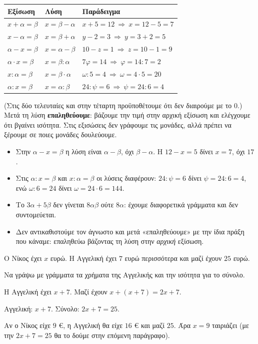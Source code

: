 \begin{center}
\renewcommand{\arraystretch}{1.5}
\begin{tabular}{@{}lll@{}}
\toprule
\textbf{Εξίσωση} & \textbf{Λύση} & \textbf{Παράδειγμα}\\
\midrule
$x+\alpha=\beta$ & $x=\beta-\alpha$ & $x+5=12\ \Rightarrow\ x=12-5=7$\\
$x-\alpha=\beta$ & $x=\beta+\alpha$ & $y-2=3\ \Rightarrow\ y=3+2=5$\\
$\alpha-x=\beta$ & $x=\alpha-\beta$ & $10-z=1\ \Rightarrow\ z=10-1=9$\\
$\alpha\cdot x=\beta$ & $x=\beta:\alpha$ & $7\varphi=14\ \Rightarrow\ \varphi=14:7=2$\\
$x:\alpha=\beta$ & $x=\beta\cdot\alpha$ & $\omega:5=4\ \Rightarrow\ \omega=4\cdot5=20$\\
$\alpha:x=\beta$ & $x=\alpha:\beta$ & $24:\psi=6\ \Rightarrow\ \psi=24:6=4$\\
\bottomrule
\end{tabular}
\end{center}

(Στις δύο τελευταίες και στην τέταρτη προϋποθέτουμε ότι δεν διαιρούμε με το $0$.) Μετά τη λύση \textbf{επαληθεύουμε}: βάζουμε την τιμή στην αρχική εξίσωση και ελέγχουμε ότι βγαίνει ισότητα. Στις εξισώσεις δεν γράφουμε τις μονάδες, αλλά πρέπει να ξέρουμε σε ποιες μονάδες δουλεύουμε.

\begin{prosoxi}
\begin{itemize}[leftmargin=1.2em,itemsep=0.3ex,topsep=2pt]
\item Στην $\alpha-x=\beta$ η λύση είναι $\alpha-\beta$, όχι $\beta-\alpha$. Η $12-x=5$ δίνει $x=7$, όχι $17$.
\item Στις $\alpha:x=\beta$ και $x:\alpha=\beta$ οι λύσεις διαφέρουν: $24:\psi=6$ δίνει $\psi=24:6=4$, ενώ $\omega:6=24$ δίνει $\omega=24\cdot6=144$.
\item Το $3\alpha+5\beta$ δεν γίνεται $8\alpha\beta$ ούτε $8\alpha$: έχουμε διαφορετικά γράμματα και δεν συντομεύεται.
\item Δεν αντικαθιστούμε τον άγνωστο και μετά «επαληθεύουμε» με την ίδια πράξη που κάναμε: επαληθεύω βάζοντας τη λύση στην \emph{αρχική} εξίσωση.
\end{itemize}
\end{prosoxi}


\tixero Ο Νίκος έχει $x$ ευρώ. Η Αγγελική έχει $7$ ευρώ περισσότερα και μαζί έχουν $25$ ευρώ.\par
\tithelo Να γράψω με γράμματα τα χρήματα της Αγγελικής και την ισότητα για το σύνολο.\par
\possindeo Η Αγγελική έχει $x+7$. Μαζί έχουν $x+(x+7)=2x+7$.\par
\apantisi Αγγελική: $x+7$. Σύνολο: $2x+7=25$.\par
\elegxos Αν ο Νίκος είχε $9$ €, η Αγγελική θα είχε $16$ € και μαζί $25$. Άρα $x=9$ ταιριάζει (με την $2x+7=25$ θα το δούμε στην επόμενη παράγραφο).

